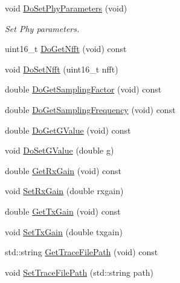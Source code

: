 \begin{DoxyCompactItemize}
\item 
void \hyperlink{classns3_1_1SimpleOfdmWimaxPhy_a4040031e0195e01fe0117a3da514597e}{Do\+Set\+Phy\+Parameters} (void)
\begin{DoxyCompactList}\small\item\em Set Phy parameters. \end{DoxyCompactList}\item 
uint16\+\_\+t \hyperlink{classns3_1_1SimpleOfdmWimaxPhy_afbd37bfeff3d01d21c67965cb645e152}{Do\+Get\+Nfft} (void) const 
\item 
void \hyperlink{classns3_1_1SimpleOfdmWimaxPhy_a51906271c767f4880fe489b6567603b5}{Do\+Set\+Nfft} (uint16\+\_\+t nfft)
\item 
double \hyperlink{classns3_1_1SimpleOfdmWimaxPhy_a384b4873a7929c2b35647d04914451d9}{Do\+Get\+Sampling\+Factor} (void) const 
\item 
double \hyperlink{classns3_1_1SimpleOfdmWimaxPhy_ae46709f574722631f43e685984017e95}{Do\+Get\+Sampling\+Frequency} (void) const 
\item 
double \hyperlink{classns3_1_1SimpleOfdmWimaxPhy_aadef9c3fe049f03d4a51ce14f3afadd7}{Do\+Get\+G\+Value} (void) const 
\item 
void \hyperlink{classns3_1_1SimpleOfdmWimaxPhy_a18db48588368edf80959491e93517ecc}{Do\+Set\+G\+Value} (double \hyperlink{loss__OH__suburban_8m_a6182af7c15da7a804d8d96b71bcd5ab7}{g})
\item 
double \hyperlink{classns3_1_1SimpleOfdmWimaxPhy_ad9e3c277c963dbee2340fc90f36b1a07}{Get\+Rx\+Gain} (void) const 
\item 
void \hyperlink{classns3_1_1SimpleOfdmWimaxPhy_a4707f9c2c7d2729f80db05db589efc81}{Set\+Rx\+Gain} (double rxgain)
\item 
double \hyperlink{classns3_1_1SimpleOfdmWimaxPhy_af9cb6087a75341f52c3985e37b860d4c}{Get\+Tx\+Gain} (void) const 
\item 
void \hyperlink{classns3_1_1SimpleOfdmWimaxPhy_ab5c2e7555bec65deffc695c90b2ce69b}{Set\+Tx\+Gain} (double txgain)
\item 
std\+::string \hyperlink{classns3_1_1SimpleOfdmWimaxPhy_afe47a07b934f698b5606c4f14b0219bf}{Get\+Trace\+File\+Path} (void) const 
\item 
void \hyperlink{classns3_1_1SimpleOfdmWimaxPhy_a3f90e6261b5238201701a7275300b008}{Set\+Trace\+File\+Path} (std\+::string path)
\end{DoxyCompactItemize}
